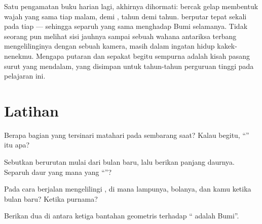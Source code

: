 \begin{remark}\label{rem:g7:moon-phases:sameface}
Satu pengamatan buku harian lagi, akhirnya dihormati: bercak gelap
 membentuk wajah yang sama tiap malam,  demi , tahun demi
tahun.  berputar tepat sekali pada  tiap  ---
sehingga separuh yang sama menghadap Bumi selamanya. Tidak seorang pun
melihat sisi jauhnya sampai sebuah wahana antariksa terbang
mengelilinginya dengan sebuah kamera, masih dalam ingatan hidup
kakek-nenekmu. Mengapa putaran dan  sepakat begitu sempurna
adalah kisah pasang surut yang mendalam, yang disimpan untuk
tahun-tahun perguruan tinggi pada pelajaran ini.
\end{remark}

\section{Latihan}

\begin{exercise}[$\star$]\label{exo:g7:moon-phases:1}
Berapa bagian  yang tersinari matahari pada sembarang saat? Kalau
begitu, ``'' itu apa?
\end{exercise}

\begin{exercise}[$\star$]\label{exo:g7:moon-phases:2}
Sebutkan  berurutan mulai dari bulan baru, lalu berikan panjang
daurnya. Separuh daur yang mana yang ``''?
\end{exercise}

\begin{exercise}[$\star$]\label{exo:g7:moon-phases:3}
Pada cara berjalan mengelilingi , di mana lampunya, bolanya,
dan kamu ketika bulan baru? Ketika purnama?
\end{exercise}

\begin{exercise}[$\star$]\label{exo:g7:moon-phases:4}
Berikan dua di antara ketiga bantahan geometris terhadap ``
adalah  Bumi''.
\end{exercise}

